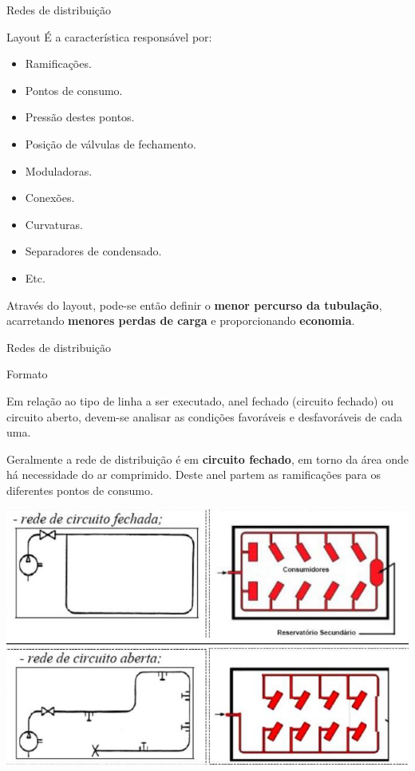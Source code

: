 \begin{frame}{Redes de distribuição}
	\begin{block}{Layout}
		É a característica responsável por:
		\begin{itemize}
			\item Ramificações.
			\item Pontos de consumo.
			\item Pressão destes pontos.
			\item Posição de válvulas de fechamento.
			\item Moduladoras.
			\item Conexões.
			\item Curvaturas.
			\item Separadores de condensado.
			\item Etc.
		\end{itemize}
		Através do layout, pode-se então definir o \textbf{menor percurso
		da tubulação}, acarretando \textbf{menores perdas de carga} e
		proporcionando \textbf{economia}.
	\end{block}
\end{frame}


\begin{frame}{Redes de distribuição}
	\begin{block}{Formato}
			
			Em relação ao tipo de linha a ser executado, anel fechado (circuito fechado) ou circuito aberto, devem-se analisar as condições favoráveis e desfavoráveis de cada uma.
			
			Geralmente a rede de distribuição é em \textbf{circuito fechado}, em torno da área onde há necessidade do ar comprimido. Deste anel partem as ramificações para os diferentes pontos de consumo.
	\end{block}

	\centering
	\includegraphics[width=0.5\linewidth]{Figuras/Ch13/fig10}
	
\end{frame}


